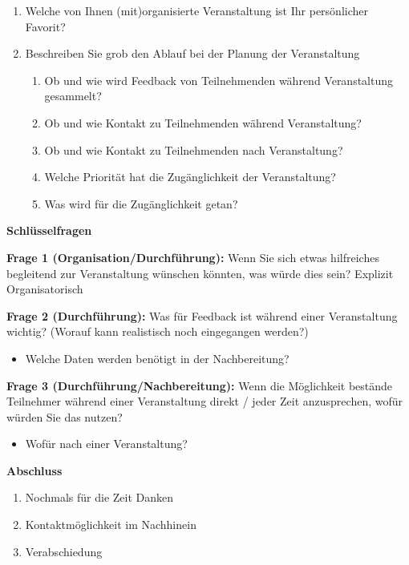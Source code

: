 \begin{enumerate}[noitemsep,topsep=0pt]
    \item  Welche von Ihnen (mit)organisierte Veranstaltung ist Ihr persönlicher
          Favorit?
    \item {
          Beschreiben Sie grob den Ablauf bei der Planung der Veranstaltung
          \begin{enumerate}[noitemsep,topsep=0pt]
              \item Ob und wie wird Feedback von Teilnehmenden während Veranstaltung gesammelt?
              \item Ob und wie Kontakt zu Teilnehmenden während Veranstaltung?
              \item Ob und wie Kontakt zu Teilnehmenden nach Veranstaltung?
              \item Welche Priorität hat die Zugänglichkeit der Veranstaltung?
              \item Was wird für die Zugänglichkeit getan?
          \end{enumerate}
          }
\end{enumerate}


\textbf{\large Schlüsselfragen}

\textbf{Frage 1 (Organisation/Durchführung):} Wenn Sie sich etwas hilfreiches begleitend zur Veranstaltung wünschen könnten, was würde dies sein? Explizit Organisatorisch

\textbf{Frage 2 (Durchführung):} Was für Feedback ist während einer
Veranstaltung wichtig? (Worauf kann realistisch noch eingegangen werden?)
\begin{itemize}[noitemsep,topsep=0pt]
    \item Welche Daten werden benötigt in der Nachbereitung?
\end{itemize}

\textbf{Frage 3 (Durchführung/Nachbereitung):} Wenn die Möglichkeit bestände
Teilnehmer während einer Veranstaltung direkt / jeder Zeit anzusprechen, wofür
würden Sie das nutzen?
\begin{itemize}[noitemsep,topsep=0pt]
    \item Wofür nach einer Veranstaltung?
\end{itemize}

\textbf{\large Abschluss}

\begin{enumerate}[noitemsep,topsep=0pt]
    \item Nochmals für die Zeit Danken
    \item Kontaktmöglichkeit im Nachhinein
    \item Verabschiedung
\end{enumerate}

